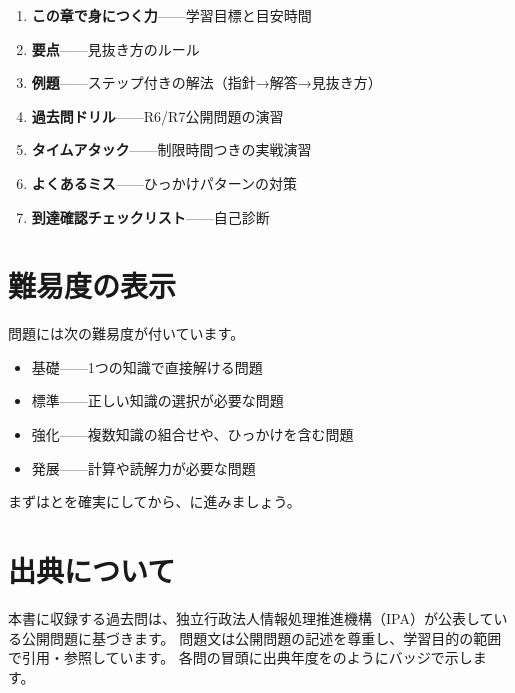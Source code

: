 \begin{enumerate}
  \item \textbf{この章で身につく力}——学習目標と目安時間
  \item \textbf{要点}——見抜き方のルール
  \item \textbf{例題}——ステップ付きの解法（指針→解答→見抜き方）
  \item \textbf{過去問ドリル}——R6/R7公開問題の演習
  \item \textbf{タイムアタック}——制限時間つきの実戦演習
  \item \textbf{よくあるミス}——ひっかけパターンの対策
  \item \textbf{到達確認チェックリスト}——自己診断
\end{enumerate}

\section*{難易度の表示}

問題には次の難易度が付いています。

\begin{itemize}
  \item {}\quad 基礎——1つの知識で直接解ける問題
  \item {}\quad 標準——正しい知識の選択が必要な問題
  \item {}\quad 強化——複数知識の組合せや、ひっかけを含む問題
  \item {}\quad 発展——計算や読解力が必要な問題
\end{itemize}

まずはとを確実にしてから、に進みましょう。

\section*{出典について}

\begin{honshiken}[出典表記]
本書に収録する過去問は、独立行政法人情報処理推進機構（IPA）が公表している公開問題に基づきます。
問題文は公開問題の記述を尊重し、学習目的の範囲で引用・参照しています。
各問の冒頭に出典年度をのようにバッジで示します。
\end{honshiken}
